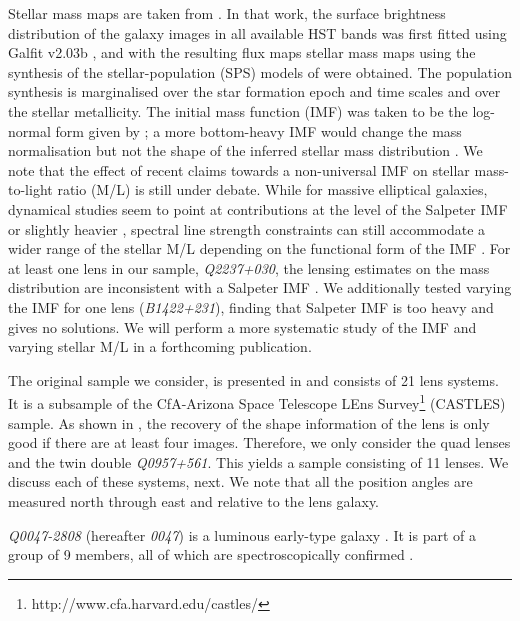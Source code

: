 \documentclass[useAMS,usenatbib]{mn2e}
\begin{document}
Stellar mass maps are taken from \citet{2011ApJ...740...97L}. In that work, the surface brightness distribution of the galaxy images in all available HST bands was first fitted using {\sc Galfit v2.03b} \citep{2002AJ....124..266P}, and with the resulting flux maps stellar mass maps using the synthesis of the stellar-population (SPS) models of \citet{2003MNRAS.344.1000B} were obtained. The population synthesis is marginalised over the star formation epoch and time scales and over the stellar metallicity. The initial mass function (IMF) was taken to be the log-normal form given by \citet{2003PASP..115..763C}; a more bottom-heavy IMF would change the mass normalisation \citep[cf.][]{2014ApJ...793...96S} but not the shape of the inferred stellar mass distribution \citep[unless the IMF presents significant intrinsic deviations locally, see e.g.][]{2015MNRAS.447.1033M}. We note that the effect of recent claims towards a non-universal IMF on stellar mass-to-light ratio (M/L) is still under debate. While for massive elliptical galaxies, dynamical studies seem to point at contributions at the level of the Salpeter IMF or slightly heavier \citep{2013MNRAS.432.1862C}, spectral line strength constraints can still accommodate a wider range of the stellar M/L depending on the functional form of the IMF \citep{2013MNRAS.429L..15F}. For at least one lens in our sample, \textit{Q2237+030}, the lensing estimates on the mass distribution are inconsistent with a Salpeter IMF \citep{2010MNRAS.409L..30F}. We additionally tested varying the IMF for one lens ({\it B1422+231}), finding that Salpeter IMF is too heavy and gives no solutions. We will perform a more systematic study of the IMF and varying stellar M/L in a forthcoming publication.

The original sample we consider, is presented in \citet{2011ApJ...740...97L} and consists of 21 lens systems. It is a subsample of the CfA-Arizona Space Telescope LEns Survey\footnote{http://www.cfa.harvard.edu/castles/} (CASTLES) sample. As shown in \citet{2014MNRAS.445.2181C}, the recovery of the shape information of the lens is only good if there are at least four images. Therefore, we only consider the quad lenses and the twin double \textit{Q0957+561}. This yields a sample consisting of 11 lenses. We discuss each of these systems, next. We note that all the position angles are measured north through east and relative to the lens galaxy.

\textit{Q0047-2808} (hereafter \textit{0047}) is a luminous early-type galaxy \citep{1996MNRAS.278..139W}. It is part of a group of 9 members, all of which are spectroscopically confirmed \citep{2011ApJ...726...84W}.
\end{document}
